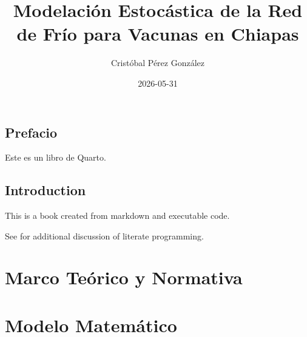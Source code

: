 \documentclass[
  spanish,
  letterpaper,
  DIV=11,
  numbers=noendperiod]{scrreprt}
\title{Modelación Estocástica de la Red de Frío para Vacunas en Chiapas}
\author{Cristóbal Pérez González}
\date{2026-05-31}
\renewcommand*\contentsname{Tabla de contenidos}
\newcommand\contentsname{Tabla de contenidos}
\begin{document}
\maketitle

\renewcommand*\contentsname{Tabla de contenidos}
{
\hypersetup{linkcolor=}
\setcounter{tocdepth}{2}
\tableofcontents
}


\chapter*{Prefacio}\label{prefacio}


Este es un libro de Quarto.


\chapter{Introduction}\label{introduction}

This is a book created from markdown and executable code.

See for additional discussion of literate programming.

\part{Marco Teórico y Normativa}

\chapter{}\label{section}

\chapter{}\label{section-1}

\part{Modelo Matemático}

\chapter{}\label{section-2}

\chapter{}\label{section-3}
\end{document}
